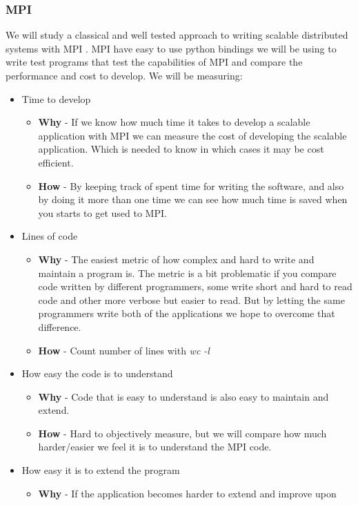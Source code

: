 \documentclass{article}
\begin{document}
\subsubsection{MPI}
We will study a classical and well tested approach to writing
scalable distributed systems with MPI \cite{gropp1996high}. MPI have easy
to use python bindings \cite{miller2002pympi} \cite{millerparallel} we will be
using to write test programs that test the capabilities of MPI and compare the
performance and cost to develop.
We will be measuring:
\begin{itemize}
\item Time to develop
\begin{itemize}
\item{ \textbf{Why} - If we know how much time it takes to develop a scalable application with
MPI we can measure the cost of developing the scalable application. Which is needed to
know in which cases it may be cost efficient.}
\item{ \textbf{How} - By keeping track of spent time for writing the software, 
and also by doing it more than one time we can see how much time is saved
when you starts to get used to MPI.}
\end{itemize}
\item Lines of code
\begin{itemize}
\item{ \textbf{Why} - The easiest metric of how complex and hard to write and
 maintain a program is. The metric is a bit problematic if you compare
 code written by different programmers, some write short and hard to read
 code and other more verbose but easier to read. But by letting the same
 programmers write both of the applications we hope to overcome that 
 difference.}
\item{ \textbf{How} - Count number of lines with \emph{wc -l}}
\end{itemize}
\item How easy the code is to understand
\begin{itemize}
\item{ \textbf{Why} - Code that is easy to understand is also easy to maintain and extend. }
\item{ \textbf{How} - Hard to objectively measure, but we will compare how much harder/easier we 
 feel it is to understand the MPI code. }
\end{itemize}
\item How easy it is to extend the program
\begin{itemize}
\item{ \textbf{Why} - If the application becomes harder to extend and improve upon 
}
\end{itemize}
\end{itemize}
\end{document}
